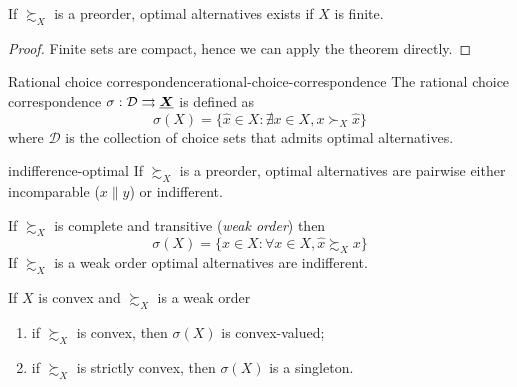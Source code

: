 \documentclass[12pt]{extarticle}
\renewcommand{\vec}[1]{\uvec{#1}}
\begin{document}
\begin{corollary}{}{}
    If $\succsim_X$ is a preorder, optimal alternatives exists if $X$ is finite.
\end{corollary}

\begin{proof}
    Finite sets are compact, hence we can apply the theorem directly.
\end{proof}

\begin{definition}{Rational choice correspondence}{rational-choice-correspondence}
    The rational choice correspondence $\sigma : \mathcal D \rightrightarrows \vec X$ is defined as
    \begin{equation}
        \sigma (X) = \{ \hat x \in X: \nexists x \in X, x \succ_X \hat x \}
    \end{equation}
    where $\mathcal D$ is the collection of choice sets that admits optimal alternatives.
\end{definition}

\begin{lemma}{}{indifference-optimal}
    If $\succsim_X$ is a preorder, optimal alternatives are pairwise either incomparable ($x \parallel y$) or indifferent.
\end{lemma}

If $\succsim_X$ is complete and transitive (\emph{weak order}) then
\begin{equation}
    \sigma(X) = \{\hat x \in X : \forall x \in X, \hat x \succsim_X x\}
\end{equation}
If $\succsim_X$ is a weak order optimal alternatives are indifferent.

\begin{proposition}{}{}
    If $X$ is convex and $\succsim_X$ is a weak order
    \begin{enumerate}[label=\roman*.]
        \item if $\succsim_X$ is convex, then $\sigma(X)$ is convex-valued;
        \item if $\succsim_X$ is strictly convex, then $\sigma(X)$ is a singleton.
    \end{enumerate}
\end{proposition}
\end{document}
